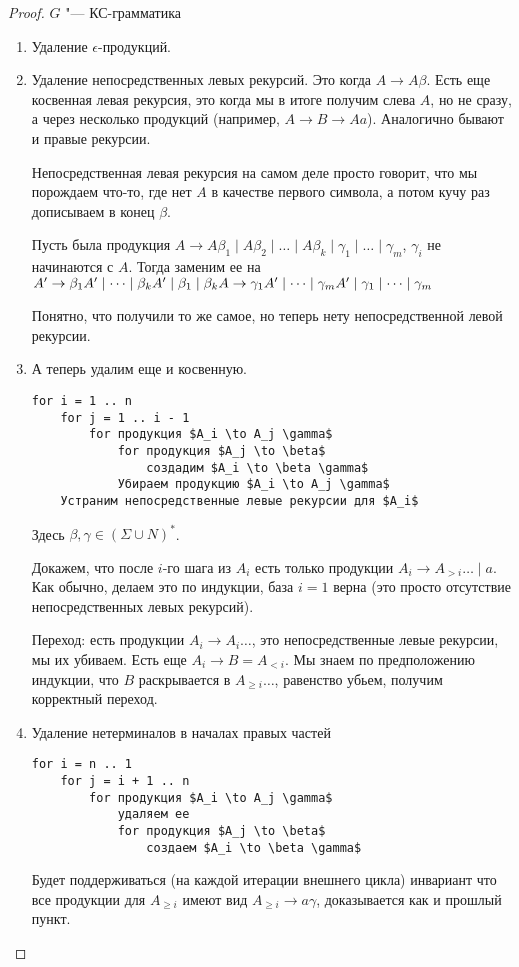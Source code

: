\begin{proof}
$G$ "--- КС-грамматика

\begin{enumerate}
\item
Удаление $\epsilon$-продукций.

\item
Удаление непосредственных левых рекурсий. Это когда $A \to A \beta$. 
Есть еще косвенная левая рекурсия, это когда мы в итоге получим слева $A$, но не сразу, а через несколько продукций (например, $A \to B \to Aa$).
Аналогично бывают и правые рекурсии.

Непосредственная левая рекурсия на самом деле просто говорит, что мы порождаем что-то, где нет $A$ в качестве первого символа, а потом кучу раз дописываем в конец $\beta$.

Пусть была продукция $A \to A \beta_1 \mid A\beta_2 \mid \dots \mid A \beta_k \mid \gamma_1 \mid \dots \mid \gamma_m$, $\gamma_i$ не начинаются с $A$.
Тогда заменим ее на $\\
A' \to \beta_1 A' \mid \dots \mid \beta_k A' \mid \beta_1 \mid \beta_k \\
A \to \gamma_1 A' \mid \dots \mid \gamma_m A' \mid \gamma_1 \mid \dots \mid \gamma_m$ 

Понятно, что получили то же самое, но теперь нету непосредственной левой рекурсии.

\item
А теперь удалим еще и косвенную.
\begin{verbatim}
for i = 1 .. n
    for j = 1 .. i - 1
        for продукция $A_i \to A_j \gamma$
            for продукция $A_j \to \beta$
                создадим $A_i \to \beta \gamma$
            Убираем продукцию $A_i \to A_j \gamma$
    Устраним непосредственные левые рекурсии для $A_i$
\end{verbatim}
Здесь $\beta, \gamma \in (\Sigma \cup N)^*$.

Докажем, что после $i$-го шага из $A_i$ есть только продукции $A_i \to A_{>i} \dots \mid a$.
Как обычно, делаем это по индукции, база $i=1$ верна (это просто отсутствие непосредственных левых рекурсий).

Переход: есть продукции $A_i \to A_i \dots$, это непосредственные левые рекурсии, мы их убиваем. 
Есть еще $A_i \to B=A_{<i}$. Мы знаем по предположению индукции, что $B$ раскрывается в $A_{\geq i} \dots$, равенство убьем, получим корректный переход.

\item
Удаление нетерминалов в началах правых частей
\begin{verbatim}
for i = n .. 1
    for j = i + 1 .. n
        for продукция $A_i \to A_j \gamma$
            удаляем ее
            for продукция $A_j \to \beta$
                создаем $A_i \to \beta \gamma$
\end{verbatim}
Будет поддерживаться (на каждой итерации внешнего цикла) инвариант что все продукции для $A_{\geq i}$ имеют вид $A_{\geq i} \to a \gamma$, доказывается как и прошлый пункт.


\end{enumerate}
\end{proof}
